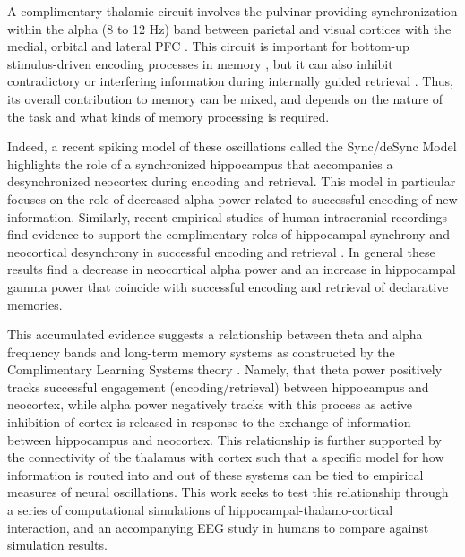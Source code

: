 \documentclass[11pt, titlepage, twoside]{article}
\begin{document}
A complimentary thalamic circuit involves the pulvinar providing synchronization within the alpha (8 to 12 Hz) band between parietal and visual cortices with the medial, orbital and lateral PFC \parencite{BarbasHenionDermon91,KievitKuypers77,LopesdaSilva91}.  This circuit is important for bottom-up stimulus-driven encoding processes in memory \parencite{JutrasFriesBuffalo13}, but it can also inhibit contradictory or interfering information during internally guided retrieval \parencite{ParkLeeKangEtAl14}.  Thus, its overall contribution to memory can be mixed, and depends on the nature of the task and what kinds of memory processing is required.

Indeed, a recent spiking model of these oscillations called the Sync/deSync Model highlights the role of a synchronized hippocampus that accompanies a desynchronized neocortex during encoding and retrieval.  This model in particular focuses on the role of decreased alpha power related to successful encoding of new information\parencite{ParishHanslmayrBowman18, HanslmayrStaresinaBowman16}.  Similarly, recent empirical studies of human intracranial recordings find evidence to support the complimentary roles of hippocampal synchrony and neocortical desynchrony in successful encoding and retrieval  \parencite{GriffithsMichelmannRouxEtAl18, StaresinaMichelmannBonnefondEtAl16}.  In general these results find a decrease in neocortical alpha power and an increase in hippocampal gamma power that coincide with successful encoding and retrieval of declarative memories. 


This accumulated evidence suggests a relationship between theta and alpha frequency bands and long-term memory systems as constructed by the Complimentary Learning Systems theory \parencite{McClellandMcNaughtonOReilly95,OReillyBhattacharyyaHowardEtAl14}.  Namely, that theta power positively tracks successful engagement (encoding/retrieval) between hippocampus and neocortex, while alpha power negatively tracks with this process as active inhibition of cortex is released in response to the exchange of information between hippocampus and neocortex.  This relationship is further supported by the connectivity of the thalamus with cortex such that a specific model for how information is routed into and out of these systems can be tied to empirical measures of neural oscillations.  This work seeks to test this relationship through a series of computational simulations of hippocampal-thalamo-cortical interaction, and an accompanying EEG study in humans to compare against simulation results.
\end{document}
